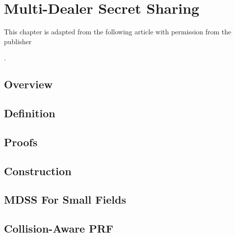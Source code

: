 \chapter{Multi-Dealer Secret Sharing} \label{chap:mdss}

\begin{singlespace}         %
	This chapter is adapted from the following article with permission from the publisher

	.
\end{singlespace}

\section{Overview}


\section{Definition}\label{sec:mdss-definition}


\section{Proofs}


\section{Construction}


\section{MDSS For Small Fields}


\section{Collision-Aware PRF}

